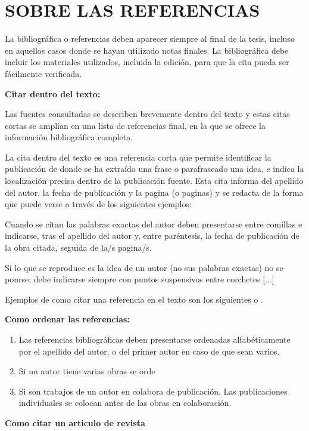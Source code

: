 {{\section{SOBRE LAS REFERENCIAS}

La bibliográfica o referencias deben aparecer siempre al final de la tesis, incluso en aquellos casos donde se hayan utilizado notas finales. La bibliográfica debe incluir los materiales utilizados, incluida la edición, para que la cita pueda ser fácilmente verificada.

\bigskip
{\bf Citar dentro del texto:}

Las fuentes consultadas se describen brevemente dentro del texto y estas citas cortas se amplían en una lista de referencias final, en la que se ofrece la información bibliográfica completa.

La cita dentro del texto es una referencia corta que permite identificar la publicación de donde se ha extraído una frase o parafraseado una idea, e indica la localización precisa dentro de la publicación fuente. Esta cita informa del apellido del autor, la fecha de publicación y la pagina (o paginas) y se redacta de la forma que puede verse a través de los siguientes ejemplos:

Cuando se citan las palabras exactas del autor deben presentarse entre comillas e indicarse, tras el apellido del autor y, entre paréntesis, la fecha de publicación de la obra citada, seguida de la/s pagina/s.

Si lo que se reproduce es la idea de un autor (no sus palabras exactas) no se ponrse; debe indicarse siempre con puntos suspensivos entre corchetes [...]

Ejemplos de como citar una referencia en el texto son los siguientes \cite{Ashtiani2014} o \cite{Ashtiani2014,Mateos2009,Vicente2016}.


\bigskip
{\bf Como ordenar las referencias:}
\begin{enumerate}
\item Las referencias bibliográficas deben presentarse ordenadas alfabéticamente por el apellido del autor, o del primer autor en caso de que sean varios.
\item Si un autor tiene varias obras se orde
\item Si son trabajos de un autor en colabora de publicación. Las publicaciones individuales se colocan antes de las obras en colaboración.
\end{enumerate}

\bigskip
{\bf Como citar un articulo de revista}

}}
